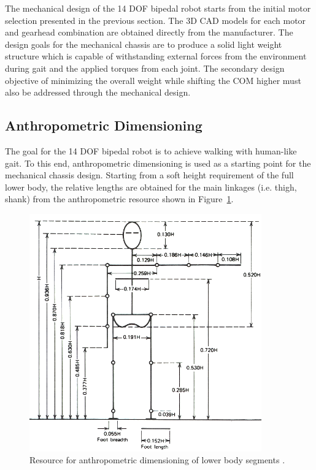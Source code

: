 The mechanical design of the 14 DOF bipedal robot starts from the initial motor selection presented in the previous section. The 3D CAD models for each motor and gearhead combination are obtained directly from the manufacturer. The design goals for the mechanical chassis are to produce a solid light weight structure which is capable of withstanding external forces from the environment during gait and the applied torques from each joint. The secondary design objective of minimizing the overall weight while shifting the COM higher must also be addressed through the mechanical design. 

\subsection{Anthropometric Dimensioning} %
\label{sub:anthropometric_dimensioning}
The goal for the 14 DOF bipedal robot is to achieve walking with human-like gait. To this end, anthropometric dimensioning is used as a starting point for the mechanical chassis design. Starting from a soft height requirement of the full lower body, the relative lengths are obtained for the main linkages (i.e. thigh, shank) from the anthropometric resource shown in Figure~\ref{fig:anthropo}. 

\begin{figure}[!h]
	\begin{center}
    \includegraphics[width=100mm]{fig/design/anthropo.png}
	\end{center}
  \caption{Resource for anthropometric dimensioning of lower body segments \cite{wintergait}.}
\label{fig:anthropo}
\end{figure}
	
